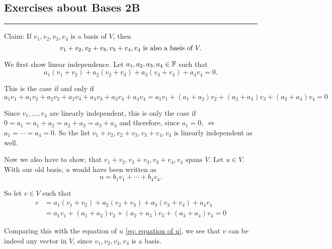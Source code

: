 \subsection*{Exercises about Bases 2B}
\hrule
\phantom{.}

\setcounter{xrcscount}{5}
\begin{xrcs}
  Claim: If $v_1, v_2, v_3, v_4$ is a basis of $V$, then
  \begin{equation}
    v_1 + v_2, v_2 + v_3, v_3+v_4, v_4 $ is also a basis of $V.
  \end{equation}

  \begin{xprf}
    \StepOne We first show linear independence. Let $a_1, a_2, a_3, a_4 \in \mathbb{F}$ such that
    \begin{equation}
      a_1 (v_1+v_2) + a_2(v_2+v_3) + a_3(v_3+v_4)+a_4 v_4 = 0.
    \end{equation}

    This is the case if and only if
    \[
    a_1 v_1 + a_1 v_2 + a_2 v_2 + a_2 v_3 + a_3 v_3 + a_3 v_4 + a_4 v_4
    = a_1 v_1 + (a_1 + a_2) v_2 + (a_2 + a_3) v_3 + (a_3 + a_4)v_4=0
    \]

    Since $v_1, \ldots, v_4$ are linearly independent, this is only the case if $0 = a_1 = a_1 + a_2 = a_2 + a_3 = a_3 + a_4$ and therefore, since $a_1=0$, $\iff$ $a_1 = \cdots = a_4 = 0$. So the list $v_1 + v_2, v_2 + v_3, v_3+v_4, v_4$ is linearly independent as well.

    \StepTwo Now we also have to show, that $v_1 + v_2, v_2 + v_3, v_3+v_4, v_4$ spans $V$. Let $u \in V$. With our old basis, $u$ would have been written as
    \begin{equation}
      \label{eq: equation of u}
      u = b_1 v_1 + \cdots + b_4 v_4.
    \end{equation}

    So let $v \in V$ such that
    \[
      \begin{aligned}
        v
        & = a_1 (v_1+v_2) + a_2(v_2+v_3) + a_3(v_3+v_4)+a_4 v_4 \\
        & = a_1 v_1 + (a_1 + a_2) v_2 + (a_2 + a_3) v_3 + (a_3 + a_4)v_4=0
      \end{aligned}
    \]

    Comparing this with the equation of $u$ \eqref{eq: equation of u}, we see that $v$ can be indeed any vector in $V$, since $v_1, v_2, v_3, v_4$ is a basis.


\end{xprf}
\end{xrcs}
